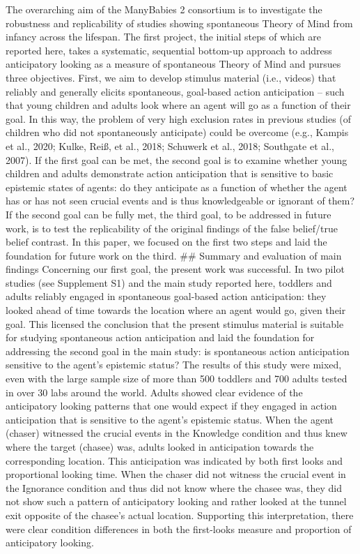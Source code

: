 \documentclass[
  man,floatsintext]{apa6}
\begin{document}
The overarching aim of the ManyBabies 2 consortium is to investigate the robustness and replicability of studies showing spontaneous Theory of Mind from infancy across the lifespan. The first project, the initial steps of which are reported here, takes a systematic, sequential bottom-up approach to address anticipatory looking as a measure of spontaneous Theory of Mind and pursues three objectives. First, we aim to develop stimulus material (i.e., videos) that reliably and generally elicits spontaneous, goal-based action anticipation -- such that young children and adults look where an agent will go as a function of their goal. In this way, the problem of very high exclusion rates in previous studies (of children who did not spontaneously anticipate) could be overcome (e.g., Kampis et al., 2020; Kulke, Reiß, et al., 2018; Schuwerk et al., 2018; Southgate et al., 2007). If the first goal can be met, the second goal is to examine whether young children and adults demonstrate action anticipation that is sensitive to basic epistemic states of agents: do they anticipate as a function of whether the agent has or has not seen crucial events and is thus knowledgeable or ignorant of them? If the second goal can be fully met, the third goal, to be addressed in future work, is to test the replicability of the original findings of the false belief/true belief contrast. In this paper, we focused on the first two steps and laid the foundation for future work on the third.
\#\# Summary and evaluation of main findings
Concerning our first goal, the present work was successful. In two pilot studies (see Supplement S1) and the main study reported here, toddlers and adults reliably engaged in spontaneous goal-based action anticipation: they looked ahead of time towards the location where an agent would go, given their goal. This licensed the conclusion that the present stimulus material is suitable for studying spontaneous action anticipation and laid the foundation for addressing the second goal in the main study: is spontaneous action anticipation sensitive to the agent's epistemic status?
The results of this study were mixed, even with the large sample size of more than 500 toddlers and 700 adults tested in over 30 labs around the world. Adults showed clear evidence of the anticipatory looking patterns that one would expect if they engaged in action anticipation that is sensitive to the agent's epistemic status. When the agent (chaser) witnessed the crucial events in the Knowledge condition and thus knew where the target (chasee) was, adults looked in anticipation towards the corresponding location. This anticipation was indicated by both first looks and proportional looking time. When the chaser did not witness the crucial event in the Ignorance condition and thus did not know where the chasee was, they did not show such a pattern of anticipatory looking and rather looked at the tunnel exit opposite of the chasee's actual location. Supporting this interpretation, there were clear condition differences in both the first-looks measure and proportion of anticipatory looking.
\end{document}
